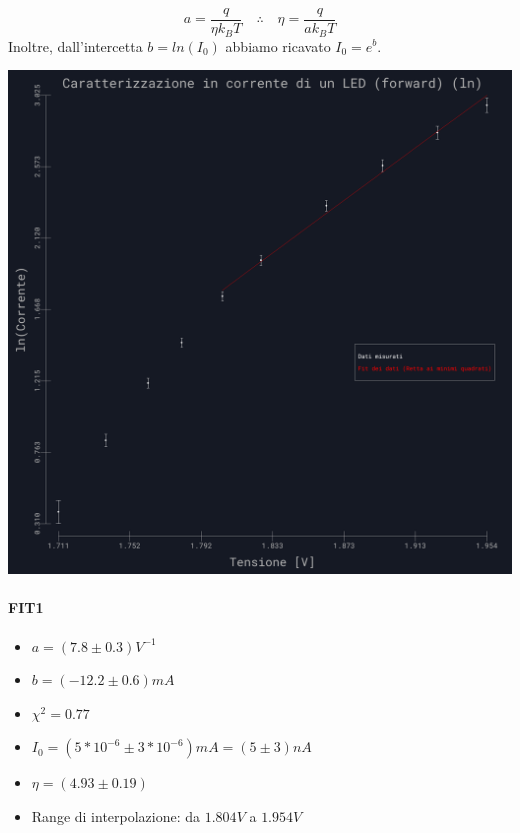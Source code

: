 \documentclass{article}
\begin{document}
$$a = \frac{q}{\eta k_B T} \quad \therefore \quad \eta = \frac{q}{ak_B T}$$
\newline
Inoltre, dall'intercetta $b=ln(I_0)$ abbiamo ricavato $I_0=e^b$.
\begin{center}
    \begin{minipage}{.6\textwidth} %
        \centering
        \includegraphics[width=\linewidth]{../images/grafico7.png} %
        \label{grafico7}
    \end{minipage}
    \hfill
    \begin{minipage}{0.35\textwidth} %
        \paragraph{FIT1}
        \begin{itemize}
            \item $a=( 7.8\pm0.3 ) V^{-1}$ 
            \item $b=(-12.2 \pm 0.6)mA $
            \item $\chi^2=0.77$
            \item $I_0=(5*10^{-6}  \pm3*10^{-6}  )mA=(5\pm3)nA$
            \item $\eta=( 4.93\pm0.19)$
            \item Range di interpolazione: da $1.804 V$ a $1.954V$
        \end{itemize}
    \end{minipage}
    \hfill %
\end{center}
\end{document}
